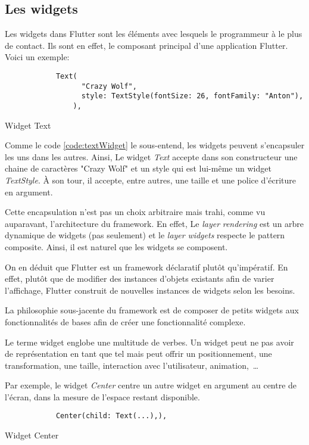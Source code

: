 \subsection{Les widgets}
Les widgets dans Flutter sont les éléments avec lesquels le programmeur à le plus de contact. Ils sont en effet, le composant principal d'une application
Flutter. Voici un exemple:

\begin{listing}[!h]
    \begin{verbatim}
            Text(
                  "Crazy Wolf",
                  style: TextStyle(fontSize: 26, fontFamily: "Anton"),
                ),
        \end{verbatim}
    \caption{Widget Text}
    \label{code:textWidget}
\end{listing}

Comme le code \autoref{code:textWidget} le sous-entend, les widgets peuvent s'encapsuler les uns dans les autres. Ainsi,
Le widget \textit{Text} accepte dans son constructeur une chaine de caractères "Crazy Wolf" et un style qui est lui-même un
widget \textit{TextStyle}. À son tour, il accepte, entre autres, une taille et une police d'écriture en argument.

Cette encapsulation n'est pas un choix arbitraire mais trahi, comme vu auparavant, l'architecture du framework. En effet,
Le \textit{layer} \textit{rendering} est un arbre dynamique de widgets (pas seulement) et le \textit{layer} \textit{widgets}
respecte le pattern composite. Ainsi, il est naturel que les widgets se composent.

On en déduit que Flutter est un framework déclaratif plutôt	qu'impératif. En effet, plutôt que de modifier des instances d'objets existants
afin de varier l'affichage, Flutter construit de nouvelles instances de widgets selon les besoins.

La philosophie sous-jacente du framework est de composer de petits widgets aux fonctionnalités de bases afin de
créer une fonctionnalité complexe.

Le terme widget englobe une multitude de verbes. Un widget peut ne pas avoir de représentation en tant que tel
mais peut offrir un positionnement, une transformation, une taille, interaction avec l'utilisateur, animation,~\dots

Par exemple, le widget \textit{Center} centre un autre widget en argument au centre de l'écran, dans la mesure de l'espace restant disponible.
\begin{listing}[h]
    \begin{verbatim}
            Center(child: Text(...),),
        \end{verbatim}
    \caption{Widget Center}
    \label{code:center}
\end{listing}


